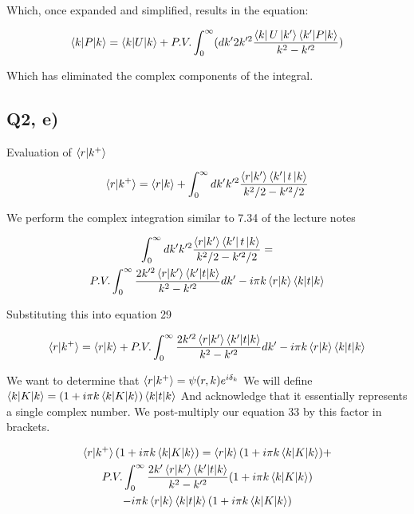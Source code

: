 \documentclass{article}
\begin{document}
			Which, once expanded and simplified, results in the equation:
			
			\begin{gather}
				\braket{k|P|k} = \braket{k|U|k} + P.V. \int_{0}^{\infty}(dk'2k'^2\frac{\bra{k}U\ket{k'}\braket{k'|P|k}}{k^2-k'^2})
			\end{gather}
			
			Which has eliminated the complex components of the integral.
			
		\subsection{Q2, e)}
			Evaluation of $\braket{r|k^+}$
			
			\begin{gather}
				\braket{r|k^+} = \braket{r|k} + \int_{0}^{\infty}dk'k'^2\frac{\braket{r|k'}\bra{k'}t\ket{k}}{k^2/2-k'^2/2}\\
			\end{gather}
			
			We perform the complex integration similar to 7.34 of the lecture notes
			
			\begin{gather}
				\int_{0}^{\infty}dk'k'^2\frac{\braket{r|k'}\bra{k'}t\ket{k}}{k^2/2-k'^2/2} =\\
				P.V. \int_{0}^{\infty}\frac{2k'^2\braket{r|k'}\braket{k'|t|k}}{k^2-k'^2}dk'	- i\pi k \braket{r|k}\braket{k|t|k}
			\end{gather}
			
			Substituting this into equation 29
			
			\begin{gather}
				\braket{r|k^+} = \braket{r|k} + P.V. \int_{0}^{\infty}\frac{2k'^2\braket{r|k'}\braket{k'|t|k}}{k^2-k'^2}dk'	- i\pi k \braket{r|k}\braket{k|t|k}
			\end{gather}
			
			We want to determine that $\braket{r|k^+} = \psi(r,k)e^{i\delta_k}$
			We will define $\braket{k|K|k} = (1+i\pi k \braket{k|K|k})\braket{k|t|k}$ And acknowledge that it essentially represents a single complex number.
			We post-multiply our equation 33 by this factor in brackets.
			
			\begin{gather}
				\braket{r|k^+}(1+i\pi k \braket{k|K|k}) = \braket{r|k}(1+i\pi k \braket{k|K|k}) +\\
				 P.V. \int_{0}^{\infty}\frac{2k'\braket{r|k'}\braket{k'|t|k}}{k^2-k'^2}(1+i\pi k \braket{k|K|k})\\	
				- i\pi k \braket{r|k}\braket{k|t|k}(1+i\pi k \braket{k|K|k})
			\end{gather}
			
\end{document}

